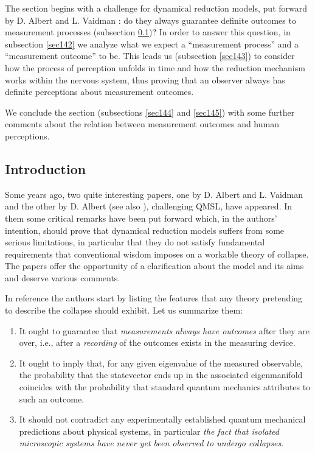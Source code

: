 \documentclass[10pt,a4paper]{article}
\begin{document}
The section begins with a challenge for dynamical reduction
models, put forward by D. Albert and L. Vaidman \cite{avp,ap}: do
they always guarantee definite outcomes to measurement processes
(subsection \ref{sec141})? In order to answer this question, in
subsection \ref{sec142} we analyze what we expect a ``measurement
process'' and a ``measurement outcome'' to be. This leads us
(subsection \ref{sec143}) to consider how the process of
perception unfolds in time and how the reduction mechanism works
within the nervous system, thus proving that an observer always
has definite perceptions about measurement outcomes.

We conclude the section (subsections \ref{sec144} and
\ref{sec145}) with some further comments about the relation
between measurement outcomes and human perceptions.



\subsection{Introduction} \label{sec141}

Some years ago, two quite interesting papers, one by D. Albert and
L. Vaidman \cite{avp} and the other by D. Albert \cite{ap} (see
also \cite{al5}), challenging QMSL, have appeared. In them some
critical remarks have been put forward which, in the authors'
intention, should prove that dynamical reduction models suffers
from some serious limitations, in particular that they do not
satisfy fundamental requirements that conventional wisdom imposes
on a workable theory of collapse. The papers offer the opportunity
of a clarification about the model and its aims and deserve
various comments.

In reference \cite{avp} the authors start by listing the features
that any theory pretending to describe the collapse should
exhibit. Let us summarize them:
\begin{enumerate}
\item It ought to guarantee that {\it measurements always have
outcomes} after they are over, i.e., after a {\it recording} of
the outcomes exists in the measuring device.

\item It ought to imply that, for any given eigenvalue of the
measured observable, the probability that the statevector ends up
in  the associated eigenmanifold coincides with the probability
that standard quantum mechanics attributes to such an outcome.

\item It should not contradict any experimentally established
quantum mechanical predictions about physical systems, in
particular {\it the fact that isolated microscopic systems have
never yet been observed to undergo collapses}.
\end{enumerate}
\end{document}
